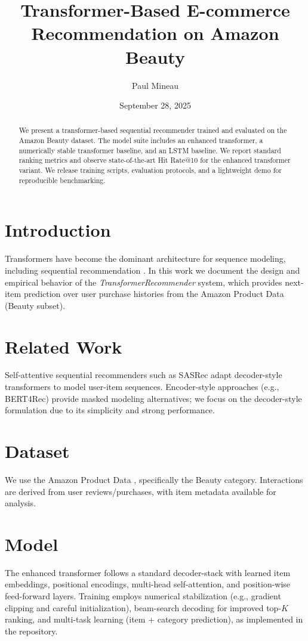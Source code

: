 \documentclass[11pt]{article}
\title{Transformer-Based E-commerce Recommendation on Amazon Beauty}
\author[1]{Paul Mineau}
\affil[1]{TransformerRecommender Repository (\url{https://github.com/PaulMineau/TransformerRecommender})}
\date{September 28, 2025}
\begin{document}
\maketitle

\begin{abstract}
We present a transformer-based sequential recommender trained and evaluated on the Amazon Beauty dataset. The model suite includes an enhanced transformer, a numerically stable transformer baseline, and an LSTM baseline. We report standard ranking metrics and observe state-of-the-art Hit Rate@10 for the enhanced transformer variant. We release training scripts, evaluation protocols, and a lightweight demo for reproducible benchmarking.
\end{abstract}

\section{Introduction}
Transformers \cite{vaswani2017attention} have become the dominant architecture for sequence modeling, including sequential recommendation \cite{kang2018sasrec}. In this work we document the design and empirical behavior of the \emph{TransformerRecommender} system, which provides next-item prediction over user purchase histories from the Amazon Product Data \cite{mcauley2015amazon} (Beauty subset).

\section{Related Work}
Self-attentive sequential recommenders such as SASRec \cite{kang2018sasrec} adapt decoder-style transformers to model user-item sequences. Encoder-style approaches (e.g., BERT4Rec) provide masked modeling alternatives; we focus on the decoder-style formulation due to its simplicity and strong performance.

\section{Dataset}
We use the Amazon Product Data \cite{mcauley2015amazon}, specifically the Beauty category. Interactions are derived from user reviews/purchases, with item metadata available for analysis.

\section{Model}
The enhanced transformer follows a standard decoder-stack with learned item embeddings, positional encodings, multi-head self-attention, and position-wise feed-forward layers. Training employs numerical stabilization (e.g., gradient clipping and careful initialization), beam-search decoding for improved top-$K$ ranking, and multi-task learning (item + category prediction), as implemented in the repository.
\end{document}
